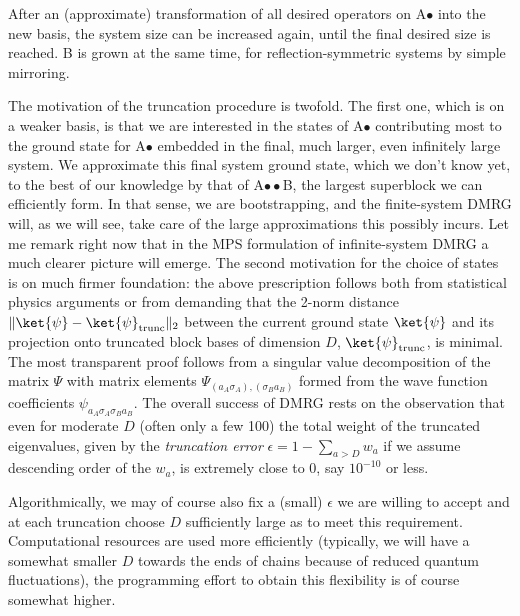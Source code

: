 After an (approximate) transformation of all desired operators on A$\bullet$ into the new basis, the system size can be increased again, until the final desired size is reached. B is grown at the same time, for reflection-symmetric systems by simple mirroring.

The motivation of the truncation procedure is twofold. The first one, which is on a weaker basis, is that we are interested in the states of A$\bullet$ contributing most to the ground state for A$\bullet$ embedded in the final, much larger, even infinitely large system. We approximate this final system ground state, which we don't know yet, to the best of our knowledge by that of A$\bullet\bullet$B, the largest superblock we can efficiently form. In that sense, we are bootstrapping, and the finite-system DMRG will, as we will see, take care of the large approximations this possibly incurs. 
Let me remark right now that in the MPS formulation of infinite-system DMRG a much clearer picture will emerge. The second motivation for the choice of states is on much firmer foundation: the above prescription follows both from statistical physics arguments or from demanding that the 2-norm distance $\| \ket{\psi} - \ket{\psi}_{{\rm trunc}} \|_2$ between the current ground state $\ket{\psi}$ and its projection onto truncated block bases of dimension $D$, $\ket{\psi}_{{\rm trunc}}$, is minimal. The most transparent proof follows from a singular value decomposition of the matrix $\Psi$ with matrix elements $\Psi_{(a_A \sigma_A), (\sigma_B a_B)}$ formed from the wave function coefficients $\psi_{a_A \sigma_A\sigma_B a_B}$. The overall success of DMRG rests on the observation that even for moderate $D$ (often only a few 100) the total weight of the truncated eigenvalues, given by the {\em truncation error} $\epsilon=1-\sum_{a>D} w_a$ if we assume descending order of the $w_a$, is extremely close to 0, say $10^{-10}$ or less. 

Algorithmically, we may of course also fix a (small) $\epsilon$ we are willing to accept and at each truncation choose $D$ sufficiently large as to meet this requirement. Computational resources are used more efficiently (typically, we will have a somewhat smaller $D$ towards the ends of chains because of reduced quantum fluctuations), the programming effort to obtain this flexibility is of course somewhat higher.

